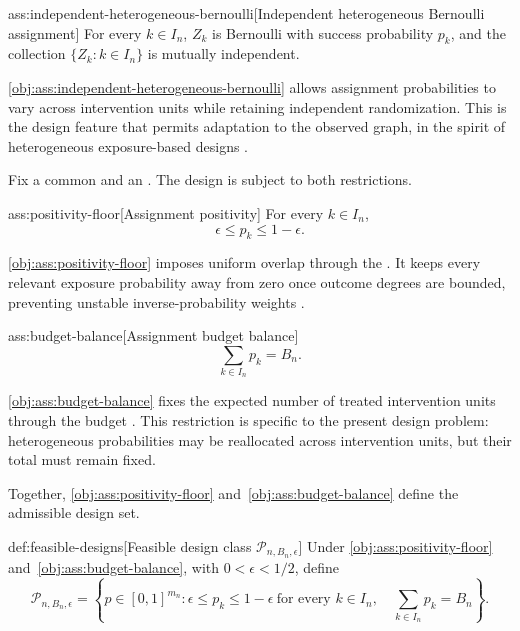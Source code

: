 \begin{assumptionv}{ass:independent-heterogeneous-bernoulli}[Independent heterogeneous Bernoulli assignment]
For every $k\in I_n$, $Z_k$ is Bernoulli with success probability $p_k$, and the collection $\{Z_k:k\in I_n\}$ is mutually independent.
\end{assumptionv}

\cref{obj:ass:independent-heterogeneous-bernoulli} allows assignment probabilities to vary across intervention units while retaining independent randomization. This is the design feature that permits adaptation to the observed graph, in the spirit of heterogeneous exposure-based designs \citep{Leung2019ApproxNeighborhoodInterference}.

Fix a common  and an . The design is subject to both restrictions.

\begin{assumptionv}{ass:positivity-floor}[Assignment positivity]
For every $k\in I_n$,
\[
\epsilon\leq p_k\leq 1-\epsilon.
\]
\end{assumptionv}

\cref{obj:ass:positivity-floor} imposes uniform overlap through the . It keeps every relevant exposure probability away from zero once outcome degrees are bounded, preventing unstable inverse-probability weights \citep{Leung2019ApproxNeighborhoodInterference}.

\begin{assumptionv}{ass:budget-balance}[Assignment budget balance]
\[
\sum_{k\in I_n}p_k=B_n.
\]
\end{assumptionv}

\cref{obj:ass:budget-balance} fixes the expected number of treated intervention units through the budget . This restriction is specific to the present design problem: heterogeneous probabilities may be reallocated across intervention units, but their total must remain fixed.

Together, \cref{obj:ass:positivity-floor} and~\cref{obj:ass:budget-balance} define the admissible design set.

\begin{definitionv}{def:feasible-designs}[Feasible design class $\mathcal P_{n,B_n,\epsilon}$]
Under \cref{obj:ass:positivity-floor} and~\cref{obj:ass:budget-balance}, with \(0<\epsilon<1/2\), define
\[
\mathcal P_{n,B_n,\epsilon}
=
\left\{
p\in[0,1]^{m_n}:
\epsilon\le p_k\le 1-\epsilon\ \text{for every } k\in I_n,
\quad
\sum_{k\in I_n}p_k=B_n
\right\}.
\]
\end{definitionv}

